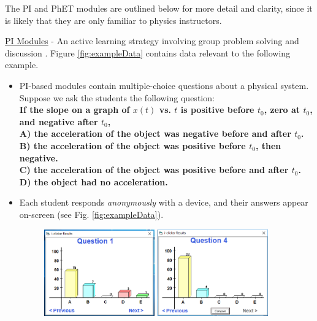 \documentclass[../../../main.tex]{subfiles}
\begin{document}
The PI and PhET modules are outlined below for more detail and clarity, since it is likely that they are only familiar to physics instructors.
\\
\vspace{0.25cm}

\underline{PI Modules} - An active learning strategy involving group problem solving and discussion \cite{mazur2013peer} \cite{AAPTPI} \cite{PhysPort}.  Figure \ref{fig:exampleData} contains data relevant to the following example.
\begin{itemize}
\item PI-based modules contain multiple-choice questions about a physical system.  Suppose we ask the students the following question: \\ \vspace{0.5cm} \textbf{If the slope on a graph of $x(t)$ vs. $t$ is positive before $t_0$, zero at $t_0$, and negative after $t_0$, \\ \vspace{0.5cm} A) the acceleration of the object was negative before and after $t_0$.  \\ B) the acceleration of the object was positive before $t_0$, then negative. \\ C) the acceleration of the object was positive before and after $t_0$. \\ D) the object had no acceleration.}
\item Each student responds \textit{anonymously} with a device, and their answers appear on-screen (see Fig. \ref{fig:exampleData}).
\begin{figure}
\centering
\includegraphics[width=0.45\textwidth,trim=0.25cm 1cm 0.15cm 2cm,clip=true]{figures/FirstData.PNG}
\includegraphics[width=0.45\textwidth,trim=0.25cm 1cm 0.15cm 2cm,clip=true]{figures/SecondData.PNG}

\end{figure}
\end{itemize}
\end{document}
